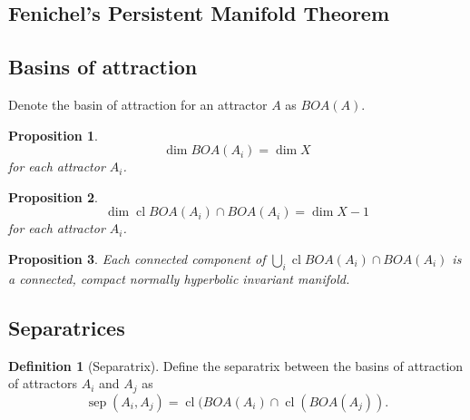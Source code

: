 \documentclass{article}
\newtheorem{proposition}{Proposition}
\theoremstyle{definition}
\newtheorem{definition}{Definition}
\theoremstyle{remark}
\newcommand{\sep}{\operatorname{sep}}
\newcommand{\cl}{\operatorname{cl}}
\begin{document}
\subsection{Fenichel's Persistent Manifold Theorem}


\subsection{Basins of attraction}
Denote the basin of attraction for an attractor $A$ as $BOA(A)$.

\begin{proposition}
\[\dim BOA(A_i) = \dim X\] for each attractor $A_i$.
\end{proposition}

\begin{proposition}
\[\dim\cl BOA(A_i) \cap BOA(A_i) = \dim X - 1 \] for each attractor $A_i$.
\end{proposition}

\begin{proposition}
Each connected component of $\bigcup_i\cl BOA(A_i) \cap BOA(A_i) $ is a connected, compact normally hyperbolic invariant manifold. %
\end{proposition}


\subsection{Separatrices}

\begin{definition}[Separatrix]\label{def:separatrix}
Define the separatrix between the basins of attraction of attractors $A_i$ and $A_j$ as 
\begin{equation}
\sep(A_i,A_j) = \cl(BOA(A_i)\cap \cl(BOA(A_j)).
\end{equation}
\end{definition}
\end{document}
